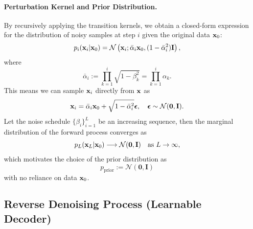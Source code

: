 \paragraph{Perturbation Kernel and Prior Distribution.}
By recursively applying the transition kernels, we obtain a closed-form expression for the distribution of noisy samples at step $i$ given the original data ${\mathbf{x}}_0$:
\[
p_i({\mathbf{x}}_i|{\mathbf{x}}_0) = \mathcal{N}\left({\mathbf{x}}_i; \bar{\alpha}_i {\mathbf{x}}_0, (1 - \bar{\alpha}_i^2) {\mathbf{I}} \right),
\]
where 
\[
\bar{\alpha}_i := \prod_{k=1}^i \sqrt{1-\beta_k^2} = \prod_{k=1}^i \alpha_k.
\]
This means we can sample ${\mathbf{x}}_i$ directly from ${\mathbf{x}}$ as
\begin{align}\label{eq:ddpm-forward}
    {\mathbf{x}}_i = \bar{\alpha}_i {\mathbf{x}}_0 + \sqrt{1-\bar{\alpha}_i^2}   \bm{\epsilon}, \quad \bm{\epsilon} \sim \mathcal{N}(\bm{0}, {\mathbf{I}}).
\end{align}
Let the noise schedule $ \{\beta_i\}_{i=1}^L $ be an increasing sequence, then the marginal distribution of the forward process converges as
\[
p_L(\mathbf{x}_L | {\mathbf{x}}_0) \longrightarrow \mathcal{N}(\mathbf{0}, \mathbf{I}) \quad \text{as } L \to \infty,
\]
which motivates the choice of the prior distribution as
\[
p_{\text{prior}} := \mathcal{N}(\mathbf{0}, \mathbf{I})
\]
with no reliance on data ${\mathbf{x}}_0$.




\subsection{Reverse Denoising Process (Learnable Decoder)}


